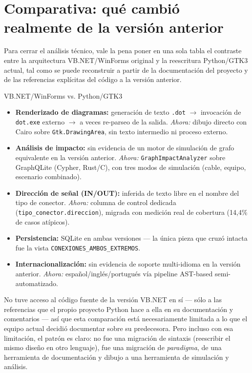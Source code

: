 \documentclass[11pt,twocolumn]{article}
\begin{document}
\section{Comparativa: qué cambió realmente de la versión anterior}

Para cerrar el análisis técnico, vale la pena poner en una sola tabla el contraste entre la arquitectura VB.NET/WinForms original y la reescritura Python/GTK3 actual, tal como se puede reconstruir a partir de la documentación del proyecto y de las referencias explícitas del código a la versión anterior.

\begin{specbox}{VB.NET/WinForms vs. Python/GTK3}
\begin{itemize}[leftmargin=1.1em,itemsep=3pt,topsep=2pt]
\item \textbf{Renderizado de diagramas:} generación de texto \texttt{.dot} $\rightarrow$ invocación de \texttt{dot.exe} externo $\rightarrow$ a veces re-parseo de la salida. \emph{Ahora:} dibujo directo con Cairo sobre \texttt{Gtk.DrawingArea}, sin texto intermedio ni proceso externo.
\item \textbf{Análisis de impacto:} sin evidencia de un motor de simulación de grafo equivalente en la versión anterior. \emph{Ahora:} \texttt{GraphImpactAnalyzer} sobre GraphQLite (Cypher, Rust/C), con tres modos de simulación (cable, equipo, escenario combinado).
\item \textbf{Dirección de señal (IN/OUT):} inferida de texto libre en el nombre del tipo de conector. \emph{Ahora:} columna de control dedicada (\texttt{tipo\_conector.direccion}), migrada con medición real de cobertura (14{,}4\% de casos atípicos).
\item \textbf{Persistencia:} SQLite en ambas versiones --- la única pieza que cruzó intacta fue la vista \texttt{CONEXIONES\_AMBOS\_EXTREMOS}.
\item \textbf{Internacionalización:} sin evidencia de soporte multi-idioma en la versión anterior. \emph{Ahora:} español/inglés/portugués vía pipeline AST-based semi-automatizado.
\end{itemize}
\end{specbox}

No tuve acceso al código fuente de la versión VB.NET en sí --- sólo a las referencias que el propio proyecto Python hace a ella en su documentación y comentarios --- así que esta comparación está necesariamente limitada a lo que el equipo actual decidió documentar sobre su predecesora. Pero incluso con esa limitación, el patrón es claro: no fue una migración de sintaxis (reescribir el mismo diseño en otro lenguaje), fue una migración de \emph{paradigma}, de una herramienta de documentación y dibujo a una herramienta de simulación y análisis.
\end{document}
